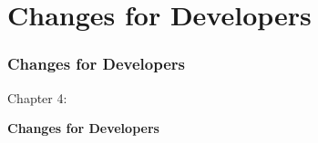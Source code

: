 %

\section{Changes for Developers}
\begin{frame}[fragile]
	\frametitle{Changes for Developers}

	\begin{center}\huge{Chapter 4:}\end{center}
	\begin{center}\huge{\color{typo3darkgrey}\textbf{Changes for Developers}}\end{center}

\end{frame}

